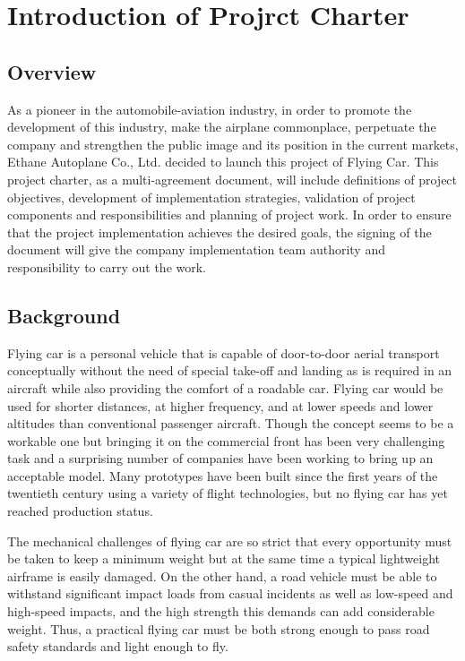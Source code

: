 \chapter{Introduction of Projrct Charter}

\section{Overview}

As a pioneer in the automobile-aviation industry, in order to promote the development of this industry, make the airplane commonplace, perpetuate the company and strengthen the public image and its position in the current markets, Ethane Autoplane Co., Ltd. decided to launch this project of Flying Car. This project charter, as a multi-agreement document, will include definitions of project objectives, development of implementation strategies, validation of project components and responsibilities and planning of project work. In order to ensure that the project implementation achieves the desired goals, the signing of the document will give the company implementation team authority and responsibility to carry out the work.

\section{Background}

Flying car is a personal vehicle that is capable of door-to-door aerial transport conceptually without the need of special take-off and landing as is required in an aircraft while also providing the comfort of a roadable car. Flying car would be used for shorter distances, at higher frequency, and at lower speeds and lower altitudes than conventional passenger aircraft. Though the concept seems to be a workable one but bringing it on the commercial front has been very challenging task and a surprising number of companies have been working to bring up an acceptable model. Many prototypes have been built since the first years of the twentieth century using a variety of flight technologies, but no flying car has yet reached production status.

The mechanical challenges of flying car are so strict that every opportunity must be taken to keep a minimum weight but at the same time a typical lightweight airframe is easily damaged. On the other hand, a road vehicle must be able to withstand significant impact loads from casual incidents as well as low-speed and high-speed impacts, and the high strength this demands can add considerable weight. Thus, a practical flying car must be both strong enough to pass road safety standards and light enough to fly. 

